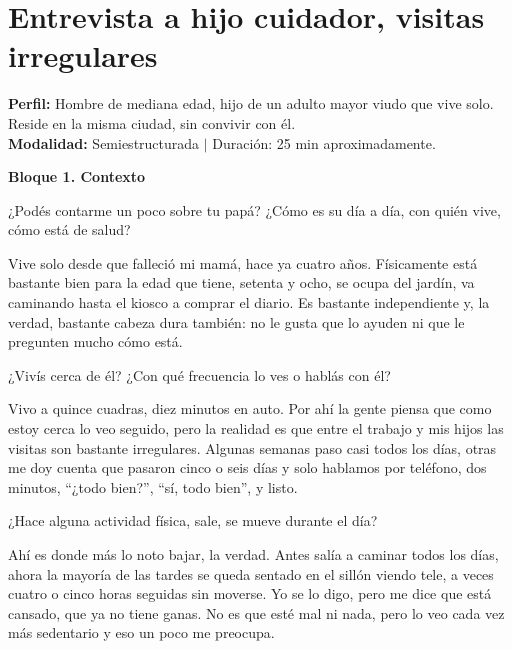 \clearpage
\section{Entrevista a hijo cuidador, visitas irregulares}

\noindent\textbf{Perfil:} Hombre de mediana edad, hijo de un adulto mayor viudo que vive solo. Reside en la misma ciudad, sin convivir con él.\\
\noindent\textbf{Modalidad:} Semiestructurada $|$ Duración: 25 min aproximadamente.

\bigskip
\textbf{Bloque 1. Contexto}

\begin{description}[leftmargin=0cm, labelsep=0.5cm]

    \item[\textbf{Entrevistador:}] ¿Podés contarme un poco sobre tu papá?
    ¿Cómo es su día a día, con quién vive, cómo está de salud?

    \item[\textbf{Entrevistado:}] Vive solo desde que falleció mi mamá, hace ya cuatro años.
    Físicamente está bastante bien para la edad que tiene, setenta y ocho, se ocupa del jardín, va caminando hasta el kiosco a comprar el diario.
    Es bastante independiente y, la verdad, bastante cabeza dura también: no le gusta que lo ayuden ni que le pregunten mucho cómo está.

    \item[\textbf{Entrevistador:}] ¿Vivís cerca de él?
    ¿Con qué frecuencia lo ves o hablás con él?

    \item[\textbf{Entrevistado:}] Vivo a quince cuadras, diez minutos en auto.
    Por ahí la gente piensa que como estoy cerca lo veo seguido, pero la realidad es que entre el trabajo y mis hijos las visitas son bastante irregulares.
    Algunas semanas paso casi todos los días, otras me doy cuenta que pasaron cinco o seis días y solo hablamos por teléfono, dos minutos, ``¿todo bien?'', ``sí, todo bien'', y listo.

    \item[\textbf{Entrevistador:}] ¿Hace alguna actividad física, sale, se mueve durante el día?

    \item[\textbf{Entrevistado:}] Ahí es donde más lo noto bajar, la verdad.
    Antes salía a caminar todos los días, ahora la mayoría de las tardes se queda sentado en el sillón viendo tele, a veces cuatro o cinco horas seguidas sin moverse.
    Yo se lo digo, pero me dice que está cansado, que ya no tiene ganas.
    No es que esté mal ni nada, pero lo veo cada vez más sedentario y eso un poco me preocupa.

\end{description}

